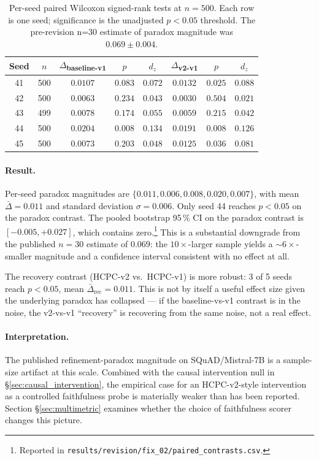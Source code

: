 \begin{table}[H]
\centering
\small
\caption{Per-seed paired Wilcoxon signed-rank tests at $n{=}500$.
Each row is one seed; significance is the unadjusted $p<0.05$
threshold. The pre-revision n=30 estimate of paradox magnitude was
$0.069 \pm 0.004$.}
\label{tab:scaling-perseed}
\begin{tabular}{cccccccc}
\toprule
Seed & $n$ & $\Delta$\textsubscript{baseline-v1} & $p$ & $d_z$
     & $\Delta$\textsubscript{v2-v1} & $p$ & $d_z$ \\
\midrule
41 & 500 & $0.0107$ & $0.083$ & $0.072$ & $0.0132$ & $\mathbf{0.025}$ & $0.088$ \\
42 & 500 & $0.0063$ & $0.234$ & $0.043$ & $0.0030$ & $0.504$ & $0.021$ \\
43 & 499 & $0.0078$ & $0.174$ & $0.055$ & $0.0059$ & $0.215$ & $0.042$ \\
44 & 500 & $0.0204$ & $\mathbf{0.008}$ & $0.134$ & $0.0191$ & $\mathbf{0.008}$ & $0.126$ \\
45 & 500 & $0.0073$ & $0.203$ & $0.048$ & $0.0125$ & $\mathbf{0.036}$ & $0.081$ \\
\bottomrule
\end{tabular}
\end{table}

\paragraph{Result.}
Per-seed paradox magnitudes are
$\{0.011, 0.006, 0.008, 0.020, 0.007\}$, with
mean $\bar{\Delta}=0.011$ and standard deviation $\sigma=0.006$.
Only seed 44 reaches $p<0.05$ on the paradox contrast. The pooled
bootstrap 95\,\% CI on the paradox contrast is
$[-0.005, +0.027]$, which contains zero.\footnote{Reported in
\texttt{results/revision/fix\_02/paired\_contrasts.csv}.}
This is a substantial downgrade from the published
$n{=}30$ estimate of $0.069$: the
$10\times$-larger sample yields a $\sim 6\times$-smaller magnitude
and a confidence interval consistent with no effect at all.

The recovery contrast (HCPC-v2 vs.\ HCPC-v1) is more robust:
3 of 5 seeds reach $p<0.05$, mean $\bar{\Delta}_{\mathrm{rec}} =
0.011$. This is not by itself a useful effect size given the
underlying paradox has collapsed --- if the baseline-vs-v1 contrast
is in the noise, the v2-vs-v1 ``recovery'' is recovering from the
same noise, not a real effect.

\paragraph{Interpretation.}
The published refinement-paradox magnitude on SQuAD/Mistral-7B is a
sample-size artifact at this scale. Combined with the causal
intervention null in \S\ref{sec:causal_intervention}, the empirical
case for an HCPC-v2-style intervention as a controlled
faithfulness probe is materially weaker than has been reported.
Section \S\ref{sec:multimetric} examines whether the choice of
faithfulness scorer changes this picture.
